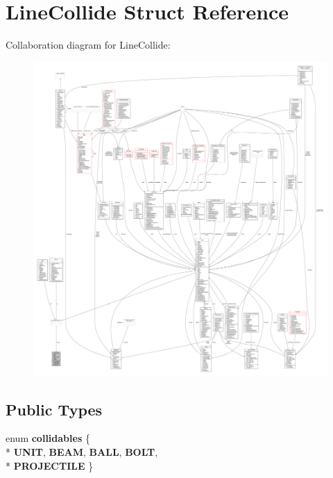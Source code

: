 \hypertarget{structLineCollide}{}\section{Line\+Collide Struct Reference}
\label{structLineCollide}


Collaboration diagram for Line\+Collide\+:
\nopagebreak
\begin{figure}[H]
\begin{center}
\leavevmode
\includegraphics[width=350pt]{d3/d1e/structLineCollide__coll__graph}
\end{center}
\end{figure}
\subsection*{Public Types}
\begin{DoxyCompactItemize}
\item 
enum {\bfseries collidables} \{ \\*
{\bfseries U\+N\+IT}, 
{\bfseries B\+E\+AM}, 
{\bfseries B\+A\+LL}, 
{\bfseries B\+O\+LT}, 
\\*
{\bfseries P\+R\+O\+J\+E\+C\+T\+I\+LE}
 \}\hypertarget{structLineCollide_ad1c90a89c9143c9b32ac1b49d9b4aebf}{}\label{structLineCollide_ad1c90a89c9143c9b32ac1b49d9b4aebf}

\end{DoxyCompactItemize}
